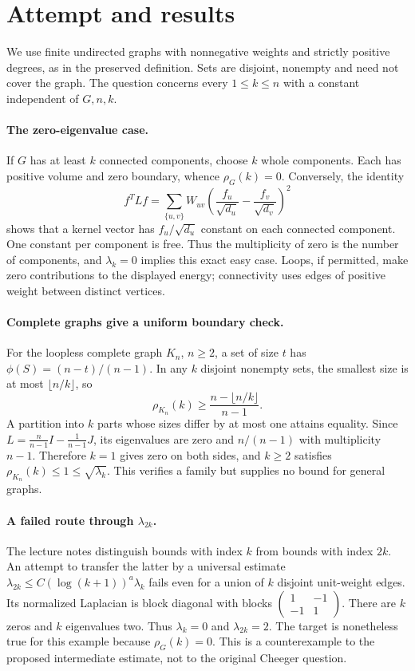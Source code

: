 \documentclass[11pt]{article}
\begin{document}
\section{Attempt and results}
We use finite undirected graphs with nonnegative weights and strictly positive
degrees, as in the preserved definition. Sets are disjoint, nonempty and need
not cover the graph. The question concerns every $1\le k\le n$ with a constant
independent of $G,n,k$.

\paragraph{The zero-eigenvalue case.}
If $G$ has at least $k$ connected components, choose $k$ whole components.
Each has positive volume and zero boundary, whence $\rho_G(k)=0$.
Conversely, the identity
\[
f^TLf=\sum_{\{u,v\}}W_{uv}
\left(\frac{f_u}{\sqrt{d_u}}-\frac{f_v}{\sqrt{d_v}}\right)^2
\]
shows that a kernel vector has $f_u/\sqrt{d_u}$ constant on each connected
component. One constant per component is free. Thus the multiplicity of zero
is the number of components, and $\lambda_k=0$ implies this exact easy case.
Loops, if permitted, make zero contributions to the displayed energy; connectivity
uses edges of positive weight between distinct vertices.

\paragraph{Complete graphs give a uniform boundary check.}
For the loopless complete graph $K_n$, $n\ge2$, a set of size $t$ has
$\phi(S)=(n-t)/(n-1)$. In any $k$ disjoint nonempty sets, the smallest size is
at most $\lfloor n/k\rfloor$, so
\[
\rho_{K_n}(k)\ge\frac{n-\lfloor n/k\rfloor}{n-1}.
\]
A partition into $k$ parts whose sizes differ by at most one attains equality.
Since $L=\frac{n}{n-1}I-\frac1{n-1}J$, its eigenvalues are zero and
$n/(n-1)$ with multiplicity $n-1$. Therefore $k=1$ gives zero on both sides,
and $k\ge2$ satisfies $\rho_{K_n}(k)\le1\le\sqrt{\lambda_k}$.
This verifies a family but supplies no bound for general graphs.

\paragraph{A failed route through $\lambda_{2k}$.}
The lecture notes distinguish bounds with index $k$ from bounds with index
$2k$. An attempt to transfer the latter by a universal estimate
$\lambda_{2k}\le C(\log(k+1))^a\lambda_k$ fails even for a union of $k$
disjoint unit-weight edges. Its normalized Laplacian is block diagonal with
blocks $\left(\begin{smallmatrix}1&-1\\-1&1\end{smallmatrix}\right)$.
There are $k$ zeros and $k$ eigenvalues two. Thus $\lambda_k=0$ and
$\lambda_{2k}=2$. The target is nonetheless true for this example because
$\rho_G(k)=0$. This is a counterexample to the proposed intermediate estimate,
not to the original Cheeger question.
\end{document}
